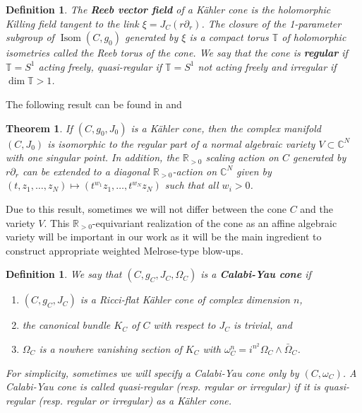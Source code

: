 \documentclass[a4paper,11pt]{article}
\newcounter{mythm}[section]
\newtheorem{tm}[mythm]{Theorem}
\newtheorem{defi}[mythm]{Definition}
\def\C{\mathbb{C}}
\def\R{\mathbb{R}}
\begin{document}
\begin{defi}
    The \textbf{Reeb vector field} of a Kähler cone is the holomorphic Killing field tangent to the link $\xi=J_C\left(r \partial_r\right)$. The closure of the 1-parameter subgroup of $\operatorname{Isom}\left(C, g_0\right)$ generated by $\xi$ is a compact torus $\mathbb{T}$ of holomorphic isometries called the Reeb torus of the cone. We say that the cone is \textbf{regular} if $\mathbb{T}=S^1$ acting freely, quasi-regular if $\mathbb{T}=S^1$ not acting freely and irregular if $\operatorname{dim} \mathbb{T}>1$.
\end{defi}
The following result can be found in \cite[Theorem 3.1]{van2011examples} and \cite[Lemma 2.20]{DonaldsonSun}
\begin{tm} \label{convar}
 If $\left(C, g_0, J_0\right)$ is a Kähler cone, then the complex manifold $\left(C, J_0\right)$ is isomorphic to the regular part of a normal algebraic variety $V \subset \mathbb{C}^N$ with one singular point. In addition, the $\R_{>0}$ scaling action on $C$ generated by $r \partial_r$ can be extended to a diagonal $\R_{>0}$-action on $\C^N$ given by $\left(t, z_1, \ldots, z_N\right) \mapsto\left(t^{w_1} z_1, \ldots, t^{w_N} z_N\right)$ such that all $w_i >0$.
\end{tm}
Due to this result, sometimes we will not differ between the cone $C$ and the variety $V$. This $\R_{>0}$-equivariant realization of the cone as an affine algebraic variety will be important in our work as it will be the main ingredient to construct appropriate weighted Melrose-type blow-ups.  
\begin{defi} \label{cycone}
    We say that $\left(C, g_C, J_C, \Omega_C\right)$ is a \textbf{Calabi-Yau cone} if
        \begin{enumerate}
            \item $\left(C, g_C, J_C\right)$ is a Ricci-flat Kähler cone of complex dimension $n$,
            \item the canonical bundle $K_C$ of $C$ with respect to $J_C$ is trivial, and
            \item $\Omega_C$ is a nowhere vanishing section of $K_C$ with $\omega_C^n=i^{n^2} \Omega_C \wedge \bar{\Omega}_C$.
        \end{enumerate}
        For simplicity, sometimes we will specify a Calabi-Yau cone only by $(C, \omega_C)$. A Calabi-Yau cone is called \emph{quasi-regular} (resp. regular or irregular) if it is quasi-regular (resp. regular or irregular) as a Kähler cone. 
\end{defi}
\end{document}
